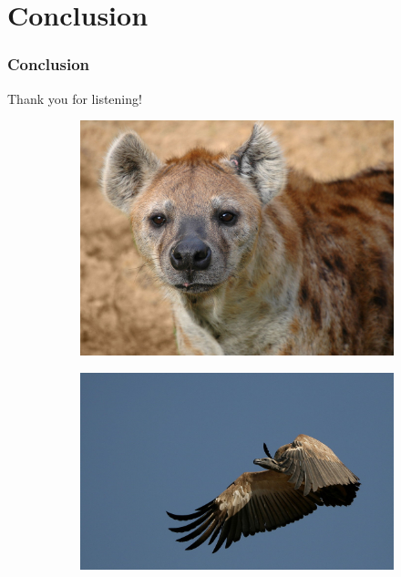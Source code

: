 \documentclass{beamer}
\begin{document}
    \section{Conclusion}
    \begin{frame}
        \frametitle{Conclusion}
    
        \begin{center}
            {\Large Thank you for listening!}
        \end{center}

        \begin{figure}
            \centering
            \begin{subfigure}{0.27\linewidth}
                \includegraphics[width=\textwidth]{Hyena.jpg}
            \end{subfigure}
            \begin{subfigure}{0.32\linewidth}
                \includegraphics[width=\textwidth]{Vulture.jpg}

\end{subfigure}
\end{figure}
\end{frame}
\end{document}
